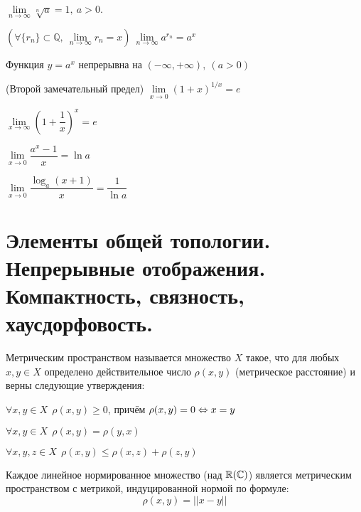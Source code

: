 \begin{multicols}{2}
\begin{lemma}{}{}
    $\lim\limits_{n\to\infty} \sqrt[n]{a} = 1,\ a > 0$.
\end{lemma}
\begin{lemma}{}{}
    $(\forall \{r_n\}\subset \mathbb Q,\ \lim\limits_{n\to\infty} r_n = x)\ \lim\limits_{n\to \infty} a^{r_n} = a^x$
\end{lemma}
\begin{theorema}{}{}
    Функция $y = a^x$ непрерывна на $(-\infty, + \infty),\ (a > 0)$
\end{theorema}
\begin{theorema}{(Второй замечательный предел)}{}
    $\lim\limits_{x\to 0} (1+x)^{1/x} = e$
\end{theorema}
\cons \begin{enumerate*}
		\item $\lim\limits_{x\to \infty} (1 + \dfrac{1}{x})^x = e$
		\item $\lim\limits_{x\to 0} \dfrac{a^x - 1}{x} = \ln a$
		\item $\lim\limits_{x\to 0} \dfrac{\log_a(x + 1)}{x} = \dfrac{1}{\ln a}$
\end{enumerate*}

    \section{Элементы общей топологии. Непрерывные отображения. Компактность, связность, хаусдорфовость.}
    \begin{definition}{}{}
        Метрическим пространством называется множество $X$ такое, что для любых $x, y \in X$ определено действительное число $\rho(x, y)$ (метрическое расстояние) и верны следующие утверждения:
        \begin{enumerate*}
            \item $\forall x, y \in X\ \ \rho(x, y) \ge 0$, причём $\rho(x, y) = 0 \Leftrightarrow x = y$
            
            \item $\forall x, y \in X\ \ \rho(x, y) = \rho(y, x)$
            
            \item $\forall x, y, z \in X\ \ \rho(x, y) \le \rho(x, z) + \rho(z, y)$
        \end{enumerate*}
    \end{definition}
    
    \begin{theorema}{}{}
        Каждое линейное нормированное множество (над $\mathbb{R}(\mathbb{C})$) является метрическим пространством с метрикой, индуцированной нормой по формуле:
        \[
            \rho(x, y) = ||x - y||
        \]
    \end{theorema}
    

\end{multicols}
